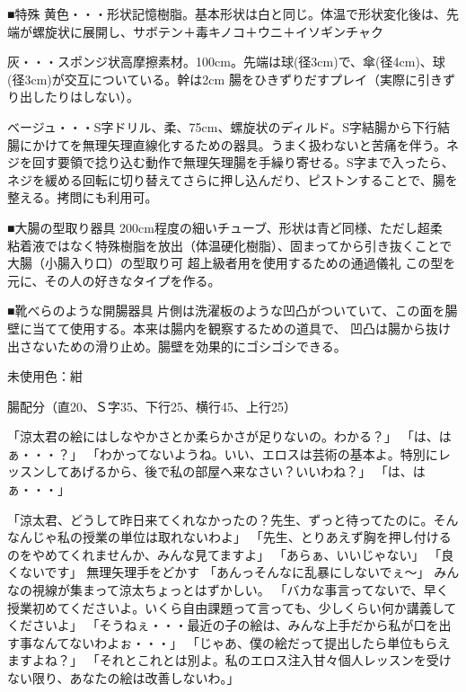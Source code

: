 ■特殊
黄色・・・形状記憶樹脂。基本形状は白と同じ。体温で形状変化後は、先端が螺旋状に展開し、サボテン＋毒キノコ＋ウニ＋イソギンチャク

灰・・・スポンジ状高摩擦素材。100cm。先端は球(径3cm)で、傘(径4cm)、球(径3cm)が交互についている。幹は2cm
腸をひきずりだすプレイ（実際に引きずり出したりはしない）。

ベージュ・・・S字ドリル、柔、75cm、螺旋状のディルド。S字結腸から下行結腸にかけてを無理矢理直線化するための器具。うまく扱わないと苦痛を伴う。ネジを回す要領で捻り込む動作で無理矢理腸を手繰り寄せる。S字まで入ったら、ネジを緩める回転に切り替えてさらに押し込んだり、ピストンすることで、腸を整える。拷問にも利用可。

■大腸の型取り器具
200cm程度の細いチューブ、形状は青ど同様、ただし超柔　粘着液ではなく特殊樹脂を放出（体温硬化樹脂）、固まってから引き抜くことで大腸（小腸入り口）の型取り可
超上級者用を使用するための通過儀礼
この型を元に、その人の好きなタイプを作る。

■靴べらのような開腸器具
片側は洗濯板のような凹凸がついていて、この面を腸壁に当てて使用する。本来は腸内を観察するための道具で、
凹凸は腸から抜け出さないための滑り止め。腸壁を効果的にゴシゴシできる。



未使用色：紺


腸配分（直20、Ｓ字35、下行25、横行45、上行25）





「涼太君の絵にはしなやかさとか柔らかさが足りないの。わかる？」
「は、はぁ・・・？」
「わかってないようね。いい、エロスは芸術の基本よ。特別にレッスンしてあげるから、後で私の部屋へ来なさい？いいわね？」
「は、はぁ・・・」

「涼太君、どうして昨日来てくれなかったの？先生、ずっと待ってたのに。そんなんじゃ私の授業の単位は取れないわよ」
「先生、とりあえず胸を押し付けるのをやめてくれませんか、みんな見てますよ」
「あらぁ、いいじゃない」
「良くないです」
無理矢理手をどかす
「あんっそんなに乱暴にしないでぇ～」
みんなの視線が集まって涼太ちょっとはずかしい。
「バカな事言ってないで、早く授業初めてくださいよ。いくら自由課題って言っても、少しくらい何か講義してくださいよ」
「そうねぇ・・・最近の子の絵は、みんな上手だから私が口を出す事なんてないわよぉ・・・」
「じゃあ、僕の絵だって提出したら単位もらえますよね？」
「それとこれとは別よ。私のエロス注入甘々個人レッスンを受けない限り、あなたの絵は改善しないわ。」



